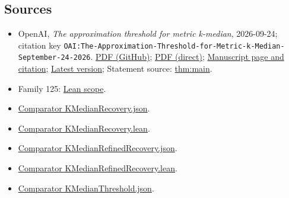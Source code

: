 \documentclass[11pt]{article}
\begin{document}
\subsection{Sources}
\begin{itemize}
\item OpenAI, \emph{The approximation threshold for metric k-median}, 2026-09-24; citation key \texttt{OAI:The-Approximation-Threshold-for-Metric-k-Median-September-24-2026}. \href{https://github.com/openai/math/blob/adc7f1241b42e322a6451854ab7e4b4c146bf78a/preprints/The-Approximation-Threshold-for-Metric-k-Median-September-24-2026/main.pdf}{PDF (GitHub)}; \href{https://github.com/openai/math/raw/adc7f1241b42e322a6451854ab7e4b4c146bf78a/preprints/The-Approximation-Threshold-for-Metric-k-Median-September-24-2026/main.pdf}{PDF (direct)}; \href{https://github.com/openai/math/blob/adc7f1241b42e322a6451854ab7e4b4c146bf78a/preprints/The-Approximation-Threshold-for-Metric-k-Median-September-24-2026/README.md}{Manuscript page and citation}; \href{https://github.com/openai/math/blob/main/preprints/The-Approximation-Threshold-for-Metric-k-Median-September-24-2026/main.pdf}{Latest version}; Statement source: \href{https://github.com/openai/math/blob/adc7f1241b42e322a6451854ab7e4b4c146bf78a/preprints/The-Approximation-Threshold-for-Metric-k-Median-September-24-2026/build/sections/introduction.tex\#L25}{thm:main}.
\item Family 125: \href{https://github.com/openai/math/blob/adc7f1241b42e322a6451854ab7e4b4c146bf78a/lean/docs/125.md}{Lean scope}.
\item \href{https://github.com/openai/math/blob/adc7f1241b42e322a6451854ab7e4b4c146bf78a/lean/ComparatorChallenges/KMedianRecovery.json}{Comparator KMedianRecovery.json}.
\item \href{https://github.com/openai/math/blob/adc7f1241b42e322a6451854ab7e4b4c146bf78a/lean/ComparatorChallenges/KMedianRecovery.lean}{Comparator KMedianRecovery.lean}.
\item \href{https://github.com/openai/math/blob/adc7f1241b42e322a6451854ab7e4b4c146bf78a/lean/ComparatorChallenges/KMedianRefinedRecovery.json}{Comparator KMedianRefinedRecovery.json}.
\item \href{https://github.com/openai/math/blob/adc7f1241b42e322a6451854ab7e4b4c146bf78a/lean/ComparatorChallenges/KMedianRefinedRecovery.lean}{Comparator KMedianRefinedRecovery.lean}.
\item \href{https://github.com/openai/math/blob/adc7f1241b42e322a6451854ab7e4b4c146bf78a/lean/ComparatorChallenges/KMedianThreshold.json}{Comparator KMedianThreshold.json}.

\end{itemize}
\end{document}
